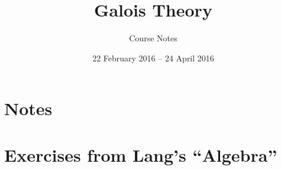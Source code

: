 \documentclass[11pt, reqno]{article}
\title{Galois Theory}
\author{Course Notes}
\date{22 February 2016 -- 24 April 2016}
\numberwithin{equation}{section}
\numberwithin{figure}{section}
\theoremstyle{plain}
\theoremstyle{definition}
\theoremstyle{remark}
\begin{document}
\maketitle

\tableofcontents
\newpage

\part{Notes}          %

%
%
%

\part{Exercises from Lang's ``Algebra''}
%
%
%
\end{document}
